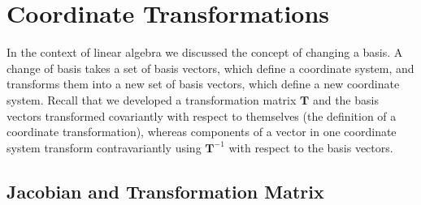 \section{Coordinate Transformations}

In the context of linear algebra we discussed the concept of changing a basis. A change of basis takes a set of basis vectors, which define a coordinate system, and transforms them into a new set of basis vectors, which define a new coordinate system. Recall that we developed a transformation matrix $\mathbf{T}$ and the basis vectors transformed covariantly with respect to themselves (the definition of a coordinate transformation), whereas components of a vector in one coordinate system transform contravariantly using $\mathbf{T}^{-1}$ with respect to the basis vectors.

\subsection{Jacobian and Transformation Matrix}


